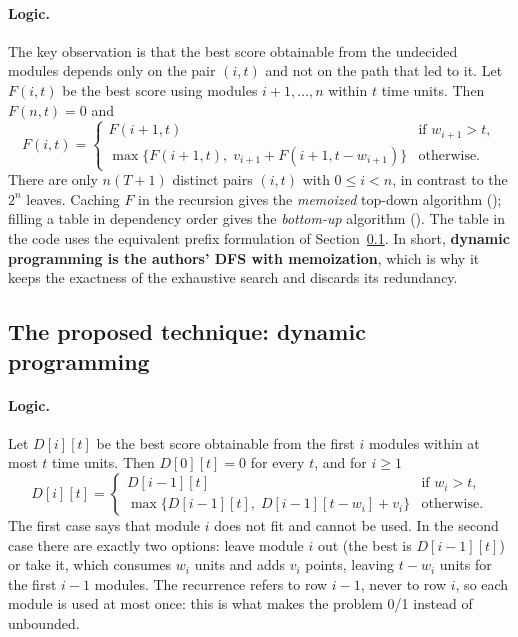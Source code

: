 \paragraph{Logic.} The key observation is that the best score obtainable from the undecided modules depends only on the pair $(i,t)$ and not on the path that led to it. Let $F(i,t)$ be the best score using modules $i+1,\dots,n$ within $t$ time units. Then $F(n,t)=0$ and
\begin{equation}
F(i,t)=\begin{cases}
F(i+1,t) & \text{if } w_{i+1}>t,\\
\max\{F(i+1,t),\; v_{i+1}+F(i+1,t-w_{i+1})\} & \text{otherwise.}
\end{cases}
\label{eq:suffix}
\end{equation}
There are only $n(T+1)$ distinct pairs $(i,t)$ with $0\le i<n$, in contrast to the $2^n$ leaves. Caching $F$ in the recursion gives the \emph{memoized} top-down algorithm (); filling a table in dependency order gives the \emph{bottom-up} algorithm (). The table in the code uses the equivalent prefix formulation of Section~\ref{sec:design-dp}. In short, \textbf{dynamic programming is the authors' DFS with memoization}, which is why it keeps the exactness of the exhaustive search and discards its redundancy.

\subsection{The proposed technique: dynamic programming}\label{sec:design-dp}

\paragraph{Logic.} Let $D[i][t]$ be the best score obtainable from the first $i$ modules within at most $t$ time units. Then $D[0][t]=0$ for every $t$, and for $i\ge1$
\begin{equation}
D[i][t]=\begin{cases}
D[i-1][t] & \text{if } w_i>t,\\
\max\{D[i-1][t],\; D[i-1][t-w_i]+v_i\} & \text{otherwise.}
\end{cases}
\label{eq:prefix}
\end{equation}
The first case says that module $i$ does not fit and cannot be used. In the second case there are exactly two options: leave module $i$ out (the best is $D[i-1][t]$) or take it, which consumes $w_i$ units and adds $v_i$ points, leaving $t-w_i$ units for the first $i-1$ modules. The recurrence refers to row $i-1$, never to row $i$, so each module is used at most once: this is what makes the problem 0/1 instead of unbounded.

